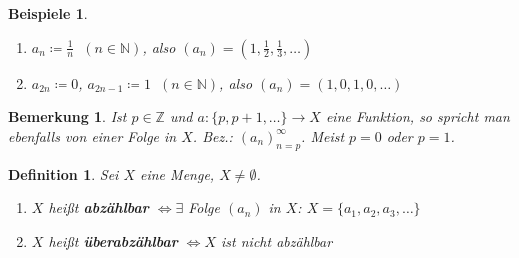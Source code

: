 \documentclass[14pt,titlepage,ngerman,a4paper,headsepline,DIV15,halfparskip*]{scrartcl}
\newcommand{\N}{\mathbb{N}}
\newcommand{\Z}{\mathbb{Z}}
\theoremstyle{named}
\theoremstyle{dotless}
\newtheorem*{beispiele}{Beispiele}
\newtheorem*{bemerkung}{Bemerkung}
\newtheorem*{definition}{Definition}
\begin{document}
\begin{beispiele} ~\
	\begin{enumerate}
		\item $a_{n} \coloneqq \frac{1}{n}$ $~(n \in \N)$, also $(a_{n}) = (1, \frac{1}{2}, \frac{1}{3}, \dotsc)$
		\item $a_{2n} \coloneqq 0$, $a_{2n-1} \coloneqq 1$ $~(n \in \N)$, also $(a_{n}) = (1, 0, 1, 0, \dotsc)$
	\end{enumerate}
\end{beispiele}


\begin{bemerkung}
	Ist $p \in \Z$ und $a \colon \{ p, p + 1, \dotsc \} \to X$ eine Funktion, so spricht man ebenfalls von einer Folge in $X$. Bez.: $(a_{n})_{n = p}^{\infty}$. Meist $p = 0$ oder $p = 1$.
\end{bemerkung}

 
\begin{definition}
	Sei $X$ eine Menge, $X \neq \emptyset$.
	\begin{enumerate}
		\item $X$ hei{\ss}t \textbf{abzählbar} $\iff \exists$ Folge $(a_{n})$ in $X$: $X = \{ a_{1}, a_{2}, a_{3}, \dotsc \}$
		\item $X$ hei{\ss}t \textbf{überabzählbar} $\iff X$ ist nicht abzählbar
	\end{enumerate}
\end{definition}
\end{document}
